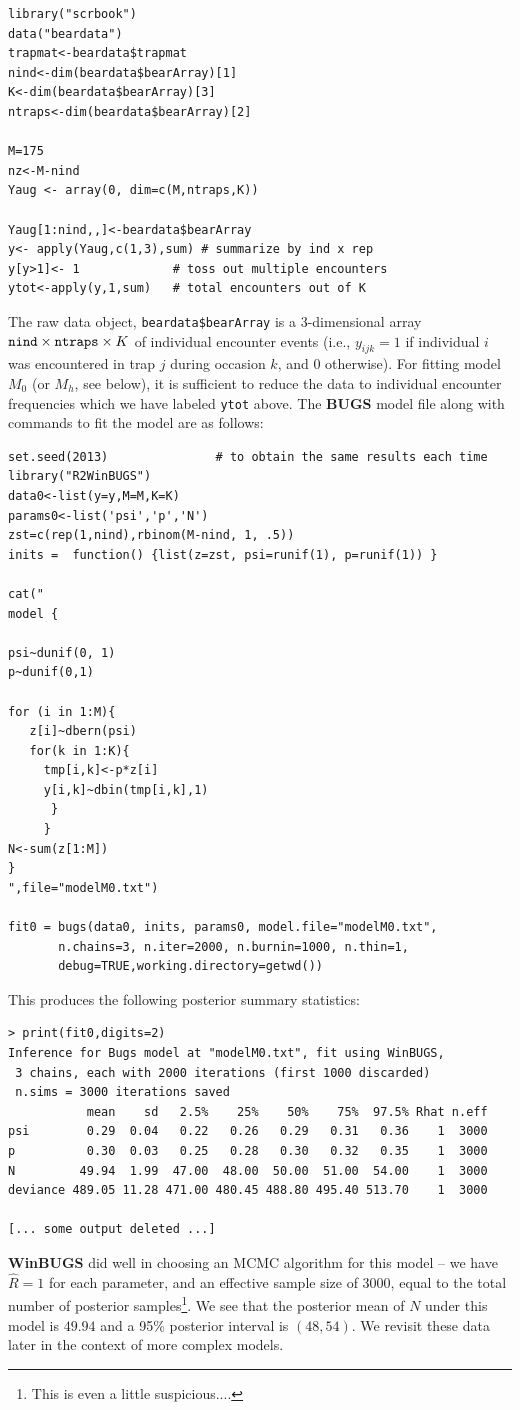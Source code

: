 {\small
\begin{verbatim}
library("scrbook")
data("beardata")
trapmat<-beardata$trapmat
nind<-dim(beardata$bearArray)[1]
K<-dim(beardata$bearArray)[3]
ntraps<-dim(beardata$bearArray)[2]

M=175
nz<-M-nind
Yaug <- array(0, dim=c(M,ntraps,K))

Yaug[1:nind,,]<-beardata$bearArray
y<- apply(Yaug,c(1,3),sum) # summarize by ind x rep
y[y>1]<- 1             # toss out multiple encounters
ytot<-apply(y,1,sum)   # total encounters out of K
\end{verbatim}
}

The raw data object, \mbox{\tt beardata\$bearArray} is a 3-dimensional
array $\mbox{\tt nind} \times \mbox{\tt ntraps} \times K$ of
individual encounter events (i.e., $y_{ijk} = 1$ if individual $i$ was
encountered in trap $j$ during occasion $k$, and 0 otherwise).  For
fitting model $M_{0}$ (or $M_{h}$, see below), it is sufficient to
reduce the data to individual encounter frequencies which we have
labeled \mbox{\tt ytot} above.  The {\bf BUGS} model file along with
commands to fit the model are as follows:

{\small
\begin{verbatim}
set.seed(2013)               # to obtain the same results each time
library("R2WinBUGS")
data0<-list(y=y,M=M,K=K)
params0<-list('psi','p','N')
zst=c(rep(1,nind),rbinom(M-nind, 1, .5))
inits =  function() {list(z=zst, psi=runif(1), p=runif(1)) }

cat("
model {

psi~dunif(0, 1)
p~dunif(0,1)

for (i in 1:M){
   z[i]~dbern(psi)
   for(k in 1:K){
     tmp[i,k]<-p*z[i]
     y[i,k]~dbin(tmp[i,k],1)
      }
     }
N<-sum(z[1:M])
}
",file="modelM0.txt")

fit0 = bugs(data0, inits, params0, model.file="modelM0.txt",
       n.chains=3, n.iter=2000, n.burnin=1000, n.thin=1,
       debug=TRUE,working.directory=getwd())
\end{verbatim}
}
This produces the following posterior
 summary statistics:
{\small
\begin{verbatim}
> print(fit0,digits=2)
Inference for Bugs model at "modelM0.txt", fit using WinBUGS,
 3 chains, each with 2000 iterations (first 1000 discarded)
 n.sims = 3000 iterations saved
           mean    sd   2.5%    25%    50%    75%  97.5% Rhat n.eff
psi        0.29  0.04   0.22   0.26   0.29   0.31   0.36    1  3000
p          0.30  0.03   0.25   0.28   0.30   0.32   0.35    1  3000
N         49.94  1.99  47.00  48.00  50.00  51.00  54.00    1  3000
deviance 489.05 11.28 471.00 480.45 488.80 495.40 513.70    1  3000

[... some output deleted ...]
\end{verbatim}
}
{\bf WinBUGS} did well in choosing an MCMC algorithm for this model --
we have $\hat{R} = 1$ for each parameter, and an effective sample size
of 3000, equal to the total number of posterior samples\footnote{This is even a little
suspicious....}.
We see that the posterior mean of $N$ under this
model is $49.94$ and a 95\% posterior interval is $(48,54)$.  We
revisit these data later in the context of more complex models.


